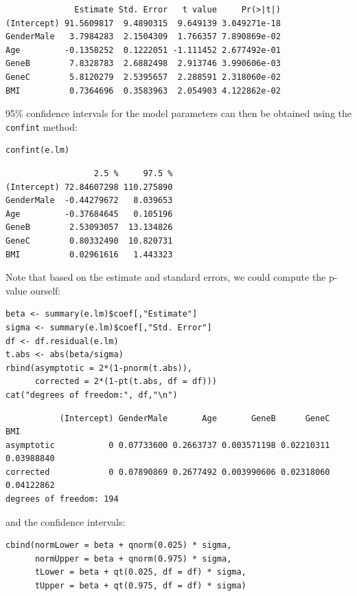 \documentclass[12pt]{article}
\begin{document}
\begin{verbatim}
              Estimate Std. Error   t value     Pr(>|t|)
(Intercept) 91.5609817  9.4890315  9.649139 3.049271e-18
GenderMale   3.7984283  2.1504309  1.766357 7.890869e-02
Age         -0.1358252  0.1222051 -1.111452 2.677492e-01
GeneB        7.8328783  2.6882498  2.913746 3.990606e-03
GeneC        5.8120279  2.5395657  2.288591 2.318060e-02
BMI          0.7364696  0.3583963  2.054903 4.122862e-02
\end{verbatim}

95\% confidence intervals for the model parameters can then be obtained
using the \texttt{confint} method:
\lstset{language=r,label= ,caption= ,captionpos=b,numbers=none}
\begin{lstlisting}
confint(e.lm)
\end{lstlisting}

\begin{verbatim}
                  2.5 %     97.5 %
(Intercept) 72.84607298 110.275890
GenderMale  -0.44279672   8.039653
Age         -0.37684645   0.105196
GeneB        2.53093057  13.134826
GeneC        0.80332490  10.820731
BMI          0.02961616   1.443323
\end{verbatim}

Note that based on the estimate and standard errors, we could compute
the p-value ourself:
\lstset{language=r,label= ,caption= ,captionpos=b,numbers=none}
\begin{lstlisting}
beta <- summary(e.lm)$coef[,"Estimate"]
sigma <- summary(e.lm)$coef[,"Std. Error"]
df <- df.residual(e.lm)
t.abs <- abs(beta/sigma)
rbind(asymptotic = 2*(1-pnorm(t.abs)),
      corrected = 2*(1-pt(t.abs, df = df)))
cat("degrees of freedom:", df,"\n")
\end{lstlisting}

\begin{verbatim}
           (Intercept) GenderMale       Age       GeneB      GeneC        BMI
asymptotic           0 0.07733600 0.2663737 0.003571198 0.02210311 0.03988840
corrected            0 0.07890869 0.2677492 0.003990606 0.02318060 0.04122862
degrees of freedom: 194
\end{verbatim}

\clearpage 
and the confidence intervals:
\lstset{language=r,label= ,caption= ,captionpos=b,numbers=none}
\begin{lstlisting}
cbind(normLower = beta + qnorm(0.025) * sigma, 
      normUpper = beta + qnorm(0.975) * sigma,
      tLower = beta + qt(0.025, df = df) * sigma, 
      tUpper = beta + qt(0.975, df = df) * sigma)
\end{lstlisting}
\end{document}
